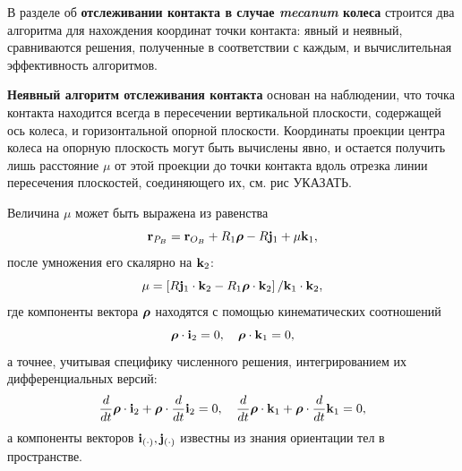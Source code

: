 В разделе об \textbf{отслеживании контакта в случае \textit{mecanum} колеса} строится два алгоритма для нахождения координат точки контакта: явный и неявный, сравниваются решения, полученные в соответствии с каждым, и вычислительная эффективность алгоритмов.

%
\textbf{Неявный алгоритм отслеживания контакта} основан на наблюдении, что точка контакта находится всегда в пересечении вертикальной плоскости, содержащей ось колеса, и горизонтальной опорной плоскости. Координаты проекции центра колеса на опорную плоскость могут быть вычислены явно, и остается получить лишь расстояние $\mu$ от этой проекции до точки контакта вдоль отрезка линии пересечения плоскостей, соединяющего их, см. рис УКАЗАТЬ.

Величина $\mu$ может быть выражена из равенства
$$
{\bf r}_{P_B}={\bf r}_{O_B}+R_1\boldsymbol{\mathbf{\rho}} -R{\bf j}_1+\mu {\bf k}_1,
$$
после умножения его скалярно на ${\bf k}_2$:
$$
\mu =\left[R{\bf j}_1\cdot{\bf k}_2-R_1{\boldsymbol{\mathbf{\rho}} }\cdot {\bf k}_2\right] /
{\bf k}_1\cdot{\bf k}_2,
$$
где компоненты вектора $\boldsymbol{\mathbf{\rho}}$ находятся с помощью кинематических соотношений
$$
\boldsymbol{\mathbf{\rho}}\cdot {\bf i}_2=0,\quad\boldsymbol{\mathbf{\rho}}\cdot {\bf k}_1=0,
$$
а точнее, учитывая специфику численного решения, интегрированием их дифференциальных версий:
$$
\dfrac{d}{dt}\boldsymbol{\mathbf{\rho}}\cdot {\bf i}_2+\boldsymbol{\mathbf{\rho}}\cdot\dfrac{d}{dt}{\bf i}_2=0,\quad
\dfrac{d}{dt}\boldsymbol{\mathbf{\rho}}\cdot {\bf k}_1+\boldsymbol{\mathbf{\rho}}\cdot\dfrac{d}{dt}{\bf k}_1=0,
$$
а компоненты векторов ${\bf i}_{(\cdot)},{\bf j}_{(\cdot)}$ известны из знания ориентации тел в пространстве.

